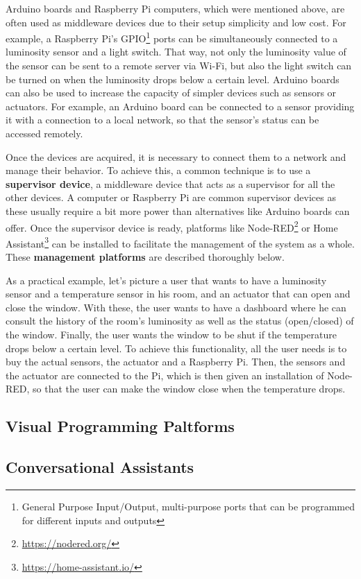 \documentclass[runningheads]{llncs}
\begin{document}
Arduino boards and Raspberry Pi computers, which were mentioned above, are often used as middleware devices due to their setup simplicity and low cost. For example, a Raspberry Pi’s GPIO\footnote{General Purpose Input/Output, multi-purpose ports that can be programmed for different inputs and outputs} ports can be simultaneously connected to a luminosity sensor and a light switch. That way, not only the luminosity value of the sensor can be sent to a remote server via Wi-Fi, but also the light switch can be turned on when the luminosity drops below a certain level. Arduino boards can also be used to increase the capacity of simpler devices such as sensors or actuators. For example, an Arduino board can be connected to a sensor providing it with a connection to a local network, so that the sensor’s status can be accessed remotely.

Once the devices are acquired, it is necessary to connect them to a network and manage their behavior. To achieve this, a common technique is to use a \textbf{supervisor device}, a middleware device that acts as a supervisor for all the other devices. A computer or Raspberry Pi are common supervisor devices as these usually require a bit more power than alternatives like Arduino boards can offer. Once the supervisor device is ready, platforms like Node-RED\footnote{\url{https://nodered.org/}} or Home Assistant\footnote{\url{https://home-assistant.io/}} can be installed to facilitate the management of the system as a whole. These \textbf{management platforms} are described thoroughly below.

As a practical example, let’s picture a user that wants to have a luminosity sensor and a temperature sensor in his room, and an actuator that can open and close the window. With these, the user wants to have a dashboard where he can consult the history of the room’s luminosity as well as the status (open/closed) of the window. Finally, the user wants the window to be shut if the temperature drops below a certain level. To achieve this functionality, all the user needs is to buy the actual sensors, the actuator and a Raspberry Pi. Then, the sensors and the actuator are connected to the Pi, which is then given an installation of Node-RED, so that the user can make the window close when the temperature drops.

\subsection{Visual Programming Paltforms}
\subsection{Conversational Assistants}
\end{document}
